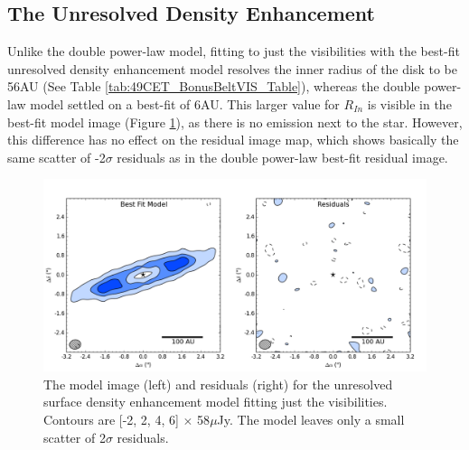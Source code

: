 {{\subsection{The Unresolved Density Enhancement}
\label{UnresolvedDensityVIS_Model}

Unlike the double power-law model, fitting to just the visibilities with the best-fit unresolved density enhancement model resolves the inner radius of the disk to be 56AU (See Table \ref{tab:49CET_BonusBeltVIS_Table}), whereas the double power-law model settled on a best-fit of 6AU. This larger value for $R_{In}$ is visible in the best-fit model image (Figure \ref{fig:49CET_BonusBeltVIS_ModelResidual}), as there is no emission next to the star. However, this difference has no effect on the residual image map, which shows basically the same scatter of -2$\sigma$ residuals as in the double power-law best-fit residual image. 

\begin{figure}
\centering
\includegraphics[width = 1\textwidth]{49CET_BonusBeltVIS_ModelResidual.png}
\caption{The model image (left) and residuals (right) for the unresolved surface density enhancement model fitting just the visibilities. Contours are [-2, 2, 4, 6] $\times$ 58$\mu$Jy. The model leaves only a small scatter of 2$\sigma$ residuals.}
\label{fig:49CET_BonusBeltVIS_ModelResidual}
\end{figure}

}}
